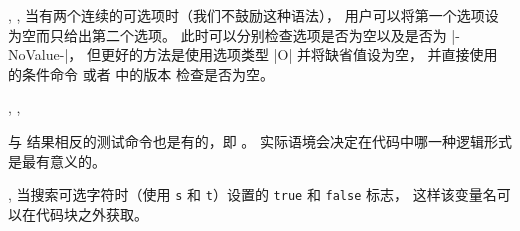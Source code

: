 \documentclass{l3doc}
\begin{document}
\begin{function}[EXP]{\IfNoValueT, \IfNoValueF, \IfNoValueTF}
%
当有两个连续的可选项时（我们不鼓励这种语法），
用户可以将第一个选项设为空而只给出第二个选项。
此时可以分别检查选项是否为空以及是否为 |-NoValue-|，
但更好的方法是使用选项类型 |O| 并将缺省值设为空，
并直接使用  的条件命令  或者  中的版本  检查是否为空。
\end{function}

%
\begin{function}[EXP]{\IfValueT, \IfValueF, \IfValueTF}
\begin{syntax}
       
\end{syntax}
与  结果相反的测试命令也是有的，即 。
实际语境会决定在代码中哪一种逻辑形式是最有意义的。
\end{function}

%
\begin{variable}{\BooleanFalse, \BooleanTrue}
    当搜索可选字符时（使用 \texttt{s} 和 \texttt{t}）设置的 \texttt{true} 和 \texttt{false} 标志，
    这样该变量名可以在代码块之外获取。
\end{variable}
\end{document}
